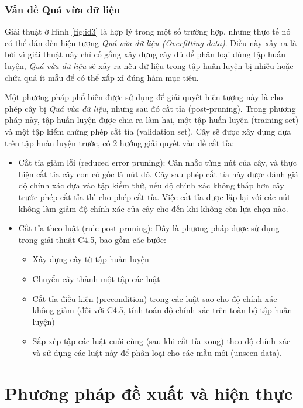 \documentclass[12pt]{report}
\begin{document}
			\subsection*{Vấn đề Quá vừa dữ liệu}
				\par Giải thuật ở Hình \ref{fig:id3} là hợp lý trong một số trường hợp, nhưng thực tế nó có thể dẫn đến hiện tượng \textit{Quá vừa dữ liệu (Overfitting data)}. Điều này xảy ra là bởi vì giải thuật này chỉ cố gắng xây dựng cây đủ để phân loại đúng tập huấn luyện, \textit{Quá vừa dữ liệu} sẽ xảy ra nếu dữ liệu trong tập huấn luyện bị nhiễu hoặc chứa quá ít mẫu để có thể xấp xỉ đúng hàm mục tiêu.
				\par Một phương pháp phổ biến được sử dụng để giải quyết hiện tượng này là cho phép cây bị \textit{Quá vừa dữ liệu}, nhưng sau đó cắt tỉa (post-pruning). Trong phương pháp này, tập huấn luyện được chia ra làm hai, một tập huấn luyện (training set) và một tập kiểm chứng phép cắt tỉa (validation set). Cây sẽ được xây dựng dựa trên tập huấn luyện trước, có 2 hướng giải quyết vấn đề cắt tỉa:
				\begin{itemize}
				\item{Cắt tỉa giảm lỗi (reduced error pruning): Cân nhắc từng nút của cây, và thực hiện cắt tỉa cây con có gốc là nút đó. Cây sau phép cắt tỉa này được đánh giá độ chính xác dựa vào tập kiểm thử, nếu độ chính xác không thấp hơn cây trước phép cắt tỉa thì cho phép cắt tỉa. Việc cắt tỉa được lặp lại với các nút không làm giảm độ chính xác của cây cho đến khi không còn lựa chọn nào.}
				\item{Cắt tỉa theo luật (rule post-pruning): Đây là phương pháp được sử dụng trong giải thuật C4.5, bao gồm các bước:
					\begin{itemize}
						\item{Xây dựng cây từ tập huấn luyện}
						\item{Chuyển cây thành một tập các luật}
						\item{Cắt tỉa điều kiện (precondition) trong các luật sao cho độ chính xác không giảm (đối với C4.5, tính toán độ chính xác trên toàn bộ tập huấn luyện)}
						\item{Sắp xếp tập các luật cuối cùng (sau khi cắt tỉa xong) theo độ chính xác và sử dụng các luật này để phân loại cho các mẫu mới (unseen data).}
					\end{itemize}}				
				\end{itemize}

	\chapter{Phương pháp đề xuất và hiện thực}	
\end{document}
